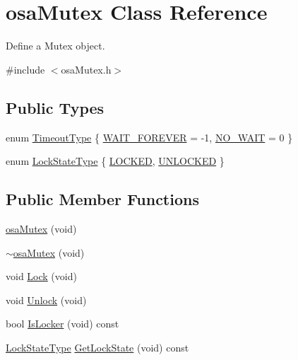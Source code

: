 \hypertarget{classosa_mutex}{}\section{osa\+Mutex Class Reference}
\label{classosa_mutex}


Define a Mutex object.  




{\ttfamily \#include $<$osa\+Mutex.\+h$>$}

\subsection*{Public Types}
\begin{DoxyCompactItemize}
\item 
enum \hyperlink{group__cisst_o_s_abstraction_ga1331d5ff33336e89fc504125ddbc41a6}{Timeout\+Type} \{ \hyperlink{group__cisst_o_s_abstraction_gga1331d5ff33336e89fc504125ddbc41a6a0fa63ec436bd067c5fa29a458799ed8e}{W\+A\+I\+T\+\_\+\+F\+O\+R\+E\+V\+E\+R} = -\/1, 
\hyperlink{group__cisst_o_s_abstraction_gga1331d5ff33336e89fc504125ddbc41a6a8de433eae9ef48be38321f282630a923}{N\+O\+\_\+\+W\+A\+I\+T} = 0
 \}
\item 
enum \hyperlink{group__cisst_o_s_abstraction_gad75274806c7433f960e8ff0c8c9d7470}{Lock\+State\+Type} \{ \hyperlink{group__cisst_o_s_abstraction_ggad75274806c7433f960e8ff0c8c9d7470a9a1066b23b0fa8c5ede7400b850dbd5a}{L\+O\+C\+K\+E\+D}, 
\hyperlink{group__cisst_o_s_abstraction_ggad75274806c7433f960e8ff0c8c9d7470a4173bfeaab7cd673588015a5529022fa}{U\+N\+L\+O\+C\+K\+E\+D}
 \}
\end{DoxyCompactItemize}
\subsection*{Public Member Functions}
\begin{DoxyCompactItemize}
\item 
\hyperlink{classosa_mutex_a81d988c657bbdb869840154492175c06}{osa\+Mutex} (void)
\item 
\hyperlink{classosa_mutex_abc1633a5825ebe4d247aa28e9ff250f8}{$\sim$osa\+Mutex} (void)
\item 
void \hyperlink{classosa_mutex_ae4cd451e30227c406bd0ffd38595ea2f}{Lock} (void)
\item 
void \hyperlink{classosa_mutex_a22e3e6d7583ec492b3560fad23d31cbc}{Unlock} (void)
\item 
bool \hyperlink{classosa_mutex_a46ee7fc86b7670322ea2db737cbc72ee}{Is\+Locker} (void) const 
\item 
\hyperlink{group__cisst_o_s_abstraction_gad75274806c7433f960e8ff0c8c9d7470}{Lock\+State\+Type} \hyperlink{classosa_mutex_a6ece8ae92f2105358ca56f55536002e0}{Get\+Lock\+State} (void) const 
\end{DoxyCompactItemize}


